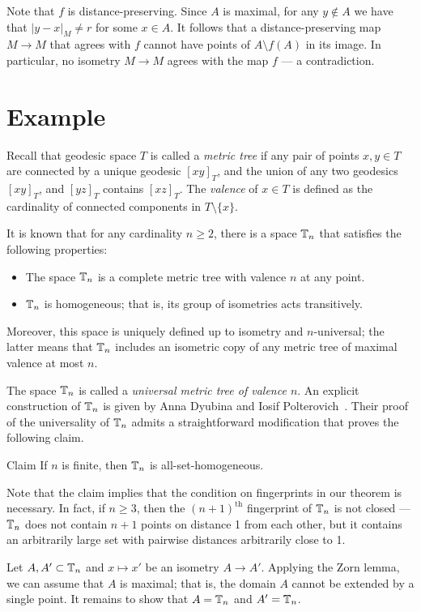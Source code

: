 \documentclass[a4paper,10pt]{article}
\begin{document}
Note that $f$ is distance-preserving.
Since $A$ is maximal, for any $y\notin A$ we have that $|y-x|_M\ne r$ for some $x\in A$.
It follows that a distance-preserving map $M\to M$ that agrees with $f$ cannot have points of $A\setminus f(A)$ in its image.
In particular, no isometry $M\to M$ agrees with the map $f$ --- a contradiction.
\qeds

\section{Example}

Recall that geodesic space $T$ is called a \emph{metric tree} if any pair of points $x,y\in T$ are connected by a unique geodesic $[xy]_T$,
and the union of any two geodesics $[xy]_T$, and $[yz]_T$ contains $[xz]_T$.
The \emph{valence} of $x\in T$ is defined as the cardinality of connected components in $T\setminus \{x\}$.

It is known that for any cardinality $n\ge 2$, there is a space $\mathbb{T}_n$ that satisfies the following properties:
\begin{itemize}
\item The space $\mathbb{T}_n$ is a complete metric tree with valence $n$ at any point.
\item $\mathbb{T}_n$ is homogeneous; that is, its group of isometries acts transitively. 
\end{itemize}
Moreover, this space is uniquely defined up to isometry and $n$-universal; the latter means that $\mathbb{T}_n$ includes an isometric copy of any metric tree of maximal valence at most $n$.

The space $\mathbb{T}_n$ is called
a \emph{universal metric tree of valence $n$}.
An explicit construction of $\mathbb{T}_n$ is given by Anna Dyubina and Iosif Polterovich~\cite{dyubina-polterovich}.
Their proof of the universality of $\mathbb{T}_n$ admits a straightforward modification that proves the following claim. 

\begin{thm}{Claim}
If $n$ is finite, then $\mathbb{T}_n$ is all-set-homogeneous.
\end{thm}

Note that the claim implies that the condition on fingerprints in our theorem is necessary.
In fact, if $n\ge 3$, then the $(n+1)^{\text{th}}$ fingerprint of $\mathbb{T}_n$ is not closed --- $\mathbb{T}_n$ does not contain $n+1$ points on distance 1 from each other,
but it contains an arbitrarily large set with pairwise distances arbitrarily close to 1.


Let $A, A'\subset \mathbb{T}_n$ and $x\mapsto x'$ be an isometry $A\to A'$.
Applying the Zorn lemma, we can assume that $A$ is maximal; that is, the domain $A$ cannot be extended by a single point.
It remains to show that $A=\mathbb{T}_n$ and $A'=\mathbb{T}_n$.
\end{document}
